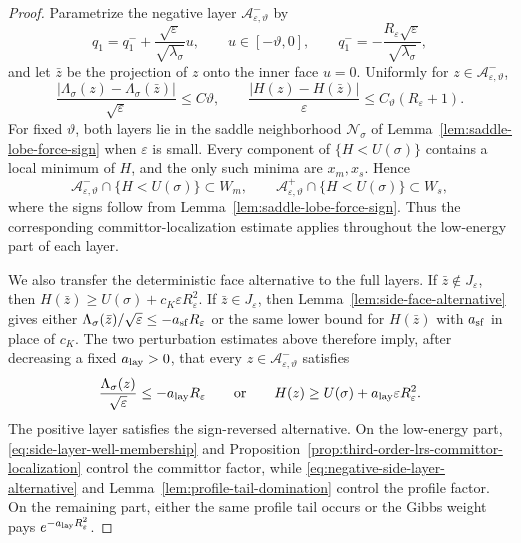 \documentclass[11pt]{article}
\numberwithin{equation}{section}
\theoremstyle{plain}
\theoremstyle{definition}
\theoremstyle{remark}
\newcommand{\eps}{\varepsilon}
\begin{document}
\begin{proof}
Parametrize the negative layer $\mathcal A_{\eps,\vartheta}^-$ by
\[
q_1=q_1^-+\frac{\sqrt\eps}{\sqrt{\lambda_\sigma}}u,
\qquad
u\in[-\vartheta,0],
\qquad
q_1^-=-\frac{R_\eps\sqrt\eps}{\sqrt{\lambda_\sigma}},
\]
and let $\bar z$ be the projection of $z$ onto the inner face $u=0$.
Uniformly for $z\in\mathcal A_{\eps,\vartheta}^-$,
\[
\frac{|\Lambda_\sigma(z)-\Lambda_\sigma(\bar z)|}{\sqrt\eps}
\le C\vartheta,
\qquad
\frac{|H(z)-H(\bar z)|}{\eps}
\le C_\vartheta(R_\eps+1).
\]
For fixed $\vartheta$, both layers lie in the saddle neighborhood
$\mathcal N_\sigma$ of Lemma~\ref{lem:saddle-lobe-force-sign} when $\eps$ is
small.  Every component of $\{H<U(\sigma)\}$ contains a local minimum of $H$,
and the only such minima are $x_m,x_s$.  Hence
\begin{equation}
\label{eq:side-layer-well-membership}
\mathcal A_{\eps,\vartheta}^-\cap\{H<U(\sigma)\}\subset W_m,
\qquad
\mathcal A_{\eps,\vartheta}^+\cap\{H<U(\sigma)\}\subset W_s,
\end{equation}
where the signs follow from Lemma~\ref{lem:saddle-lobe-force-sign}.  Thus the
corresponding committor-localization estimate applies throughout the
low-energy part of each layer.

We also transfer the deterministic face alternative to the full layers.  If
$\bar z\notin J_\eps$, then
$H(\bar z)\ge U(\sigma)+c_K\eps R_\eps^2$.  If $\bar z\in J_\eps$, then
Lemma~\ref{lem:side-face-alternative} gives either
$\Lambda_\sigma(\bar z)/\sqrt\eps\le-a_{\rm sf}R_\eps$ or the same lower
bound for $H(\bar z)$ with $a_{\rm sf}$ in place of $c_K$.  The two
perturbation estimates above therefore imply, after decreasing a fixed
$a_{\rm lay}>0$, that every $z\in\mathcal A_{\eps,\vartheta}^-$ satisfies
\begin{equation}
\label{eq:negative-side-layer-alternative}
\frac{\Lambda_\sigma(z)}{\sqrt\eps}\le-a_{\rm lay}R_\eps
\qquad\hbox{or}\qquad
H(z)\ge U(\sigma)+a_{\rm lay}\eps R_\eps^2.
\end{equation}
The positive layer satisfies the sign-reversed alternative.  On the
low-energy part, \eqref{eq:side-layer-well-membership} and
Proposition~\ref{prop:third-order-lrs-committor-localization} control the
committor factor, while \eqref{eq:negative-side-layer-alternative} and
Lemma~\ref{lem:profile-tail-domination} control the profile factor.  On the
remaining part, either the same profile tail occurs or the Gibbs weight pays
$e^{-a_{\rm lay}R_\eps^2}$.


\end{proof}
\end{document}
